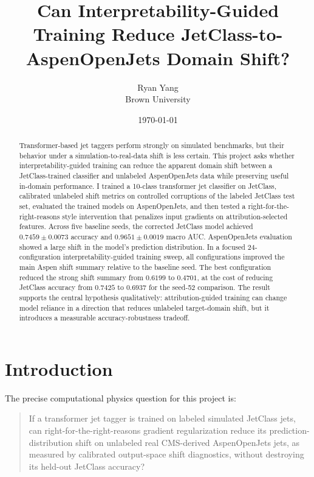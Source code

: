 \documentclass[11pt]{article}
\title{Can Interpretability-Guided Training Reduce JetClass-to-AspenOpenJets Domain Shift?}
\author{Ryan Yang\\Brown University}
\date{\today}
\begin{document}
\maketitle

\begin{abstract}
Transformer-based jet taggers perform strongly on simulated benchmarks, but their behavior under a simulation-to-real-data shift is less certain. This project asks whether interpretability-guided training can reduce the apparent domain shift between a JetClass-trained classifier and unlabeled AspenOpenJets data while preserving useful in-domain performance. I trained a 10-class transformer jet classifier on JetClass, calibrated unlabeled shift metrics on controlled corruptions of the labeled JetClass test set, evaluated the trained models on AspenOpenJets, and then tested a right-for-the-right-reasons style intervention that penalizes input gradients on attribution-selected features. Across five baseline seeds, the corrected JetClass model achieved $0.7459\pm0.0073$ accuracy and $0.9651\pm0.0019$ macro AUC. AspenOpenJets evaluation showed a large shift in the model's prediction distribution. In a focused 24-configuration interpretability-guided training sweep, all configurations improved the main Aspen shift summary relative to the baseline seed. The best configuration reduced the strong shift summary from $0.6199$ to $0.4701$, at the cost of reducing JetClass accuracy from $0.7425$ to $0.6937$ for the seed-52 comparison. The result supports the central hypothesis qualitatively: attribution-guided training can change model reliance in a direction that reduces unlabeled target-domain shift, but it introduces a measurable accuracy-robustness tradeoff.
\end{abstract}

\section{Introduction}

The precise computational physics question for this project is:
\begin{quote}
If a transformer jet tagger is trained on labeled simulated JetClass jets, can right-for-the-right-reasons gradient regularization reduce its prediction-distribution shift on unlabeled real CMS-derived AspenOpenJets jets, as measured by calibrated output-space shift diagnostics, without destroying its held-out JetClass accuracy?
\end{quote}
\end{document}
